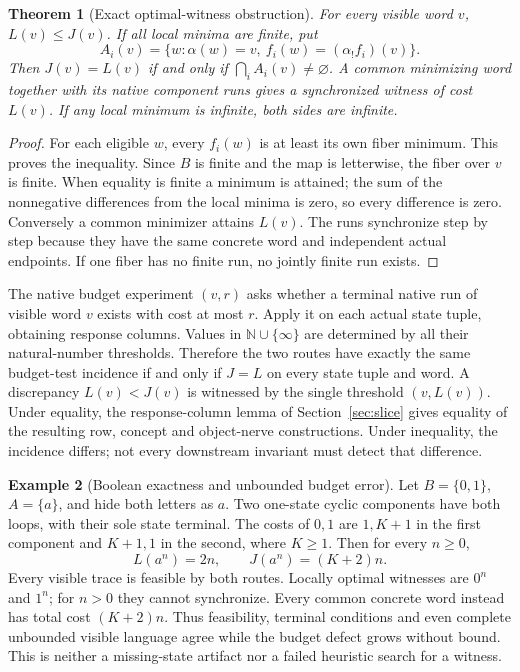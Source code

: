 \documentclass[11pt]{article}
\newtheorem{theorem}{Theorem}[section]
\theoremstyle{definition}\newtheorem{definition}[theorem]{Definition}
\newtheorem{example}[theorem]{Example}
\theoremstyle{remark}\newtheorem{remark}[theorem]{Remark}
\newcommand{\Cost}{\mathbb N\cup\{\infty\}}
\begin{document}
\begin{theorem}[Exact optimal-witness obstruction]\label{thm:native-gap}
For every visible word $v$, $L(v)\leq J(v)$. If all local minima are
finite, put
\[
 A_i(v)=\{w:\alpha(w)=v,\ f_i(w)=(\alpha_!f_i)(v)\}.
\]
Then $J(v)=L(v)$ if and only if $\bigcap_iA_i(v)\ne\varnothing$.
A common minimizing word together with its native component runs gives
a synchronized witness of cost $L(v)$. If any local minimum is infinite,
both sides are infinite.
\end{theorem}
\begin{proof}
For each eligible $w$, every $f_i(w)$ is at least its own fiber minimum.
This proves the inequality. Since $B$ is finite and the map is letterwise,
the fiber over $v$ is finite. When equality is finite a minimum is attained;
the sum of the nonnegative differences from the local minima is zero,
so every difference is zero. Conversely a common minimizer attains $L(v)$.
The runs synchronize step by step because they have the same concrete
word and independent actual endpoints. If one fiber has no finite run,
no jointly finite run exists.
\end{proof}

The native budget experiment $(v,r)$ asks whether a terminal native run
of visible word $v$ exists with cost at most $r$. Apply it on each actual
state tuple, obtaining response columns. Values in $\Cost$ are determined
by all their natural-number thresholds. Therefore the two routes have
exactly the same budget-test incidence if and only if $J=L$ on every
state tuple and word. A discrepancy $L(v)<J(v)$ is witnessed by the
single threshold $(v,L(v))$. Under equality, the response-column lemma
of Section~\ref{sec:slice} gives equality of the resulting row, concept
and object-nerve constructions. Under inequality, the incidence differs;
not every downstream invariant must detect that difference.

\begin{example}[Boolean exactness and unbounded budget error]
Let $B=\{0,1\}$, $A=\{a\}$, and hide both letters as $a$.
Two one-state cyclic components have both loops, with their sole state
terminal. The costs of $0,1$ are $1,K+1$ in the first component and
$K+1,1$ in the second, where $K\geq1$. Then for every $n\geq0$,
\[
 L(a^n)=2n,\qquad J(a^n)=(K+2)n.
\]
Every visible trace is feasible by both routes. Locally optimal witnesses
are $0^n$ and $1^n$; for $n>0$ they cannot synchronize. Every common
concrete word instead has total cost $(K+2)n$. Thus feasibility, terminal
conditions and even complete unbounded visible language agree while the
budget defect grows without bound. This is neither a missing-state
artifact nor a failed heuristic search for a witness.
\end{example}
\end{document}
